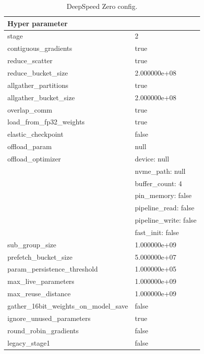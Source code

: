 \begin{table}
    \def\arraystretch{1.5}
    \small
    \centering
    \caption{DeepSpeed Zero config.}
    \label{tab:inclusion-exclusion-criteria}
    \begin{tabularx}{\textwidth}{XX}
        \toprule
        \textbf{Hyper parameter} & \\
        \midrule
        stage & 2\\
        contiguous\_gradients & true\\
        reduce\_scatter & true\\
        reduce\_bucket\_size & 2.000000e+08\\
        allgather\_partitions & true\\
        allgather\_bucket\_size & 2.000000e+08\\
        overlap\_comm & true\\
        load\_from\_fp32\_weights & true\\
        elastic\_checkpoint & false\\
        offload\_param & null\\
        \midrule
        offload\_optimizer & device: null\\
        & nvme\_path: null\\
        & buffer\_count: 4\\
        & pin\_memory: false\\
        & pipeline\_read: false\\
        & pipeline\_write: false\\
        & fast\_init: false\\
        \midrule
        sub\_group\_size & 1.000000e+09\\
        prefetch\_bucket\_size & 5.000000e+07\\
        param\_persistence\_threshold & 1.000000e+05\\
        max\_live\_parameters & 1.000000e+09\\
        max\_reuse\_distance & 1.000000e+09\\
        gather\_16bit\_weights\_on\_model\_save & false\\
        ignore\_unused\_parameters & true\\
        round\_robin\_gradients & false\\
        legacy\_stage1 & false\\
        \bottomrule
    \end{tabularx}
\end{table}

